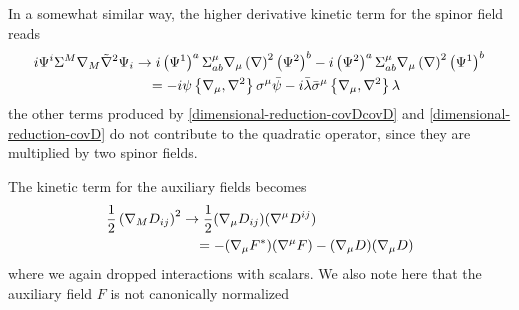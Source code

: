 In a somewhat similar way, the higher derivative kinetic term for the spinor field reads
\begin{equation}\label{dim-red-psisigmacovDcovDpsi}
\begin{split}
i \Psi^i \Sigma^M { \mathcal{\nabla} }_M \tilde {{ \mathcal{\nabla} }}^2 \Psi_i
	& \rightarrow 
		i \left( \Psi^1 \right)^a \Sigma^\mu_{ab} 
			{ \mathcal{\nabla} }_\mu \left( { \mathcal{\nabla} } \right)^2 \left( \Psi^2 \right)^b 
			- i \left( \Psi^2 \right)^a	\Sigma^\mu_{ab} 
			{ \mathcal{\nabla} }_\mu \left( { \mathcal{\nabla} } \right)^2 \left( \Psi^1 \right)^b 
	\\
	& \quad = 
		- i \psi \left\{ { \mathcal{\nabla} }_\mu, { \mathcal{\nabla} }^2 \right\}
			\sigma^\mu \bar \psi
		- i \bar \lambda \bar \sigma^\mu  
			\left\{ { \mathcal{\nabla} }_\mu, { \mathcal{\nabla} }^2 \right\}	 \lambda
\end{split}
\end{equation}
the other terms produced by \eqref{dimensional-reduction-covDcovD} and \eqref{dimensional-reduction-covD} do not contribute to the quadratic operator, since they are multiplied by two spinor fields.

The kinetic term for the auxiliary fields becomes
\begin{equation}\label{dim-red-covDDij2}
\begin{split}
\frac{1}{2} \left( { \mathcal{\nabla} }_M D_{ij} \right)^2
	& \rightarrow 
		\frac{1}{2} ( { \mathcal{\nabla} }_\mu D_{ij}) ({ \mathcal{\nabla} }^{\mu} D^{ij} )
	\\
	& \quad = 
		- ( { \mathcal{\nabla} }_\mu F^* ) ( { \mathcal{\nabla} }^\mu F )  
		- ( { \mathcal{\nabla} }_\mu D ) ( { \mathcal{\nabla} }_\mu D )
\end{split}
\end{equation}
where we again dropped interactions with scalars. We also note here that the auxiliary field $F$ is not canonically normalized%



